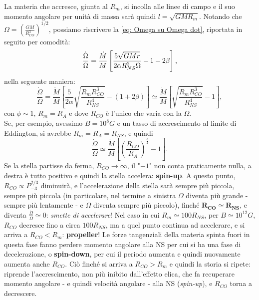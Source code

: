 \subsubsection{}
La materia che accresce, giunta al $R_m$, si incolla alle linee di campo e il suo momento angolare per unità di massa sarà quindi $l=\sqrt{GMR_m}$.
Notando che $\Omega = \left( \frac{GM}{R_{CO}^3} \right)^{1/2} $, possiamo riscrivere la \eqref{eq: Omega su Omega dot}, riportata in seguito per comodità:
\begin{align}
    \frac{\dot{\Omega}}{\Omega}= \frac{\dot{M}}{M}\left[ \frac{5\sqrt{GMr}}{2\alpha R_{NS}^2\Omega}-1-2\beta \right],
     \notag
\end{align}
nella seguente maniera:
\begin{equation}
    \frac{\dot{\Omega}}{\Omega} = \frac{\dot{M}}{M} \left[ \frac{5}{2\alpha} \sqrt{\frac{R_mR_{CO}^3}{R_{NS}^4}} - (1+2\beta) \right] \simeq \frac{\dot{M}}{M} \left[ \sqrt{\frac{R_mR_{CO}^3}{R_{NS}^4}} - 1 \right],
    \label{eq: Omegadot su Omega coi raggi}
\end{equation}
con $\phi \sim 1 $, $R_m = R_A$ e dove $R_{CO}$ è  l'unico che varia con la $\Omega$.\vspace{2mm}\\
Se, per esempio, avessimo $B = 10^8G$ e un tasso di accrescimento al limite di Eddington, si avrebbe $R_m = R_A = R_{NS}$, e quindi
\begin{equation}
     \frac{\dot{\Omega}}{\Omega} \simeq \frac{\dot{M}}{M} \left[ \left(\frac{R_{CO}}{R_A}\right)^{\frac{3}{2}} - 1 \right].
\end{equation}
Se la stella partisse da ferma, $R_{CO}\xrightarrow{}\infty $, il "$-1$" non conta praticamente nulla, a destra è tutto positivo e quindi la stella accelera: \textbf{spin-up}.
A questo punto, $R_{CO}\propto P_{-3}^{2/3} $ diminuirà, e l'accelerazione della stella sarà sempre più piccola, sempre più piccola (in particolare, nel termine a sinistra $\Omega$ diventa più grande - sempre più lentamente - e $\dot{\Omega}$ diventa sempre più piccolo), finché $\mathbf{R_{CO} \simeq R_{NS}}$, e diventa $\frac{\dot{\Omega}}{\Omega}\simeq 0$: \textit{smette di accelerare}!
Nel caso in cui $R_m \simeq 100R_{NS}$, per $B \simeq 10^{12}G $, $R_{CO}$ decresce fino a circa $100R_{NS}$, ma a quel punto continua ad accelerare, e si arriva a $R_{CO}<R_m $: \textbf{propeller}!
Le forze tangenziali della materia spinta fuori in questa fase fanno perdere momento angolare alla NS per cui si ha una fase di decelerazione, o \textbf{spin-down}, per cui il periodo aumenta e quindi nuovamente aumenta anche $R_{CO}$. Ciò finché si arriva a $R_{CO} > R_m $ e quindi la storia si ripete: riprende l'accrescimento, non più inibito dall'effetto elica, che fa recuperare momento angolare - e quindi velocità angolare - alla NS (\textit{spin-up}), e $R_{CO}$ torna a decrescere.

